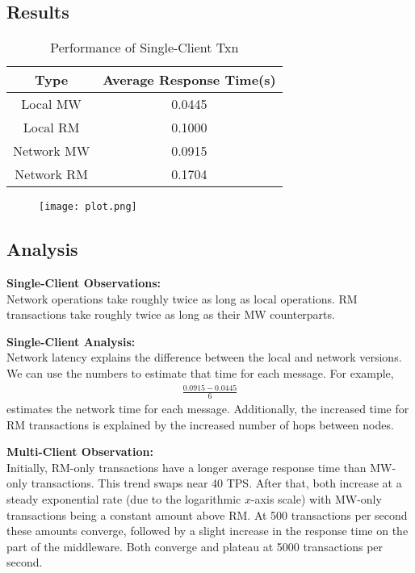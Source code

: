 \documentclass[11pt]{article}
\begin{document}
\subsection*{Results}

\begin{table}[H]
\centering
\caption{Performance of Single-Client Txn}
\begin{tabular}{c|c}
Type & Average Response Time(s) \\
\hline
Local MW & 0.0445 \\
Local RM & 0.1000 \\
Network MW & 0.0915 \\
Network RM & 0.1704 \\
\end{tabular}
\end{table}

\begin{figure}[H]
\centering
\texttt{[image: plot.png]}
\end{figure}

\subsection*{Analysis}

\textbf{Single-Client Observations:} \\
Network operations take roughly twice as long as local operations. RM transactions take roughly twice as long as their MW counterparts.\par

\textbf{Single-Client Analysis:} \\
Network latency explains the difference between the local and network versions. We can use the numbers to estimate that time for each message. For example, 
\begin{align*}
\frac{0.0915 - 0.0445}{6}
\end{align*}
estimates the network time for each message. Additionally, the increased time for RM transactions is explained by the increased number of hops between nodes. \par

\textbf{Multi-Client Observation:}\\
Initially, RM-only transactions have a longer average response time than MW-only transactions. This trend swaps near 40 TPS. After that, both increase at a steady exponential rate (due to the logarithmic $x$-axis scale) with MW-only transactions being a constant amount above RM. At 500 transactions per second these amounts converge, followed by a slight increase in the response time on the part of the middleware. Both converge and plateau at 5000 transactions per second. \par
\end{document}
